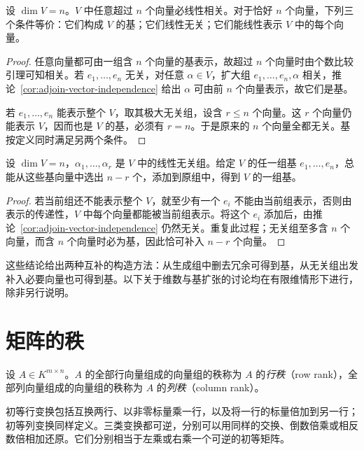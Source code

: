 \begin{theorem}
\label{thm:finite-dimensional-basis-criteria}
设 $\dim V=n$。$V$ 中任意超过 $n$ 个向量必线性相关。对于恰好 $n$ 个向量，下列三个条件等价：它们构成 $V$ 的基；它们线性无关；它们能线性表示 $V$ 中的每个向量。
\end{theorem}

\begin{proof}
任意向量都可由一组含 $n$ 个向量的基表示，故超过 $n$ 个向量时由个数比较引理可知相关。若 $e_1,\ldots,e_n$ 无关，对任意 $\alpha\in V$，扩大组 $e_1,\ldots,e_n,\alpha$ 相关，推论~\ref{cor:adjoin-vector-independence} 给出 $\alpha$ 可由前 $n$ 个向量表示，故它们是基。

若 $e_1,\ldots,e_n$ 能表示整个 $V$，取其极大无关组，设含 $r\leq n$ 个向量。这 $r$ 个向量仍能表示 $V$，因而也是 $V$ 的基，必须有 $r=n$。于是原来的 $n$ 个向量全都无关。基按定义同时满足另两个条件。
\end{proof}

\begin{theorem}[基扩张定理]
\label{thm:basis-extension}
设 $\dim V=n$，$\alpha_1,\ldots,\alpha_r$ 是 $V$ 中的线性无关组。给定 $V$ 的任一组基 $e_1,\ldots,e_n$，总能从这些基向量中选出 $n-r$ 个，添加到原组中，得到 $V$ 的一组基。
\end{theorem}

\begin{proof}
若当前组还不能表示整个 $V$，就至少有一个 $e_i$ 不能由当前组表示，否则由表示的传递性，$V$ 中每个向量都能被当前组表示。将这个 $e_i$ 添加后，由推论~\ref{cor:adjoin-vector-independence} 仍然无关。重复此过程；无关组至多含 $n$ 个向量，而含 $n$ 个向量时必为基，因此恰可补入 $n-r$ 个向量。
\end{proof}

这些结论给出两种互补的构造方法：从生成组中删去冗余可得到基，从无关组出发补入必要向量也可得到基。以下关于维数与基扩张的讨论均在有限维情形下进行，除非另行说明。

\section{矩阵的秩}
\label{sec:matrix-rank}

\begin{definition}
\label{def:matrix-row-column-rank}
设 $A\in K^{m\times n}$。$A$ 的全部行向量组成的向量组的秩称为 $A$ 的\emph{行秩}（row rank），全部列向量组成的向量组的秩称为 $A$ 的\emph{列秩}（column rank）。
\end{definition}

初等行变换包括互换两行、以非零标量乘一行，以及将一行的标量倍加到另一行；初等列变换同样定义。三类变换都可逆，分别可以用同样的交换、倒数倍乘或相反数倍相加还原。它们分别相当于左乘或右乘一个可逆的初等矩阵。

